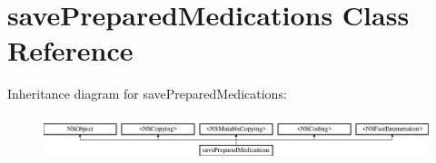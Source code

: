 \hypertarget{interfacesave_prepared_medications}{}\section{save\+Prepared\+Medications Class Reference}
\label{interfacesave_prepared_medications}
Inheritance diagram for save\+Prepared\+Medications\+:\begin{figure}[H]
\begin{center}
\leavevmode
\includegraphics[height=1.333333cm]{interfacesave_prepared_medications}
\end{center}
\end{figure}
